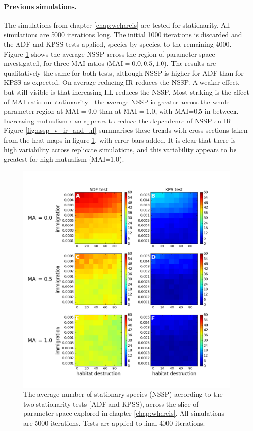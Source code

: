 \paragraph*{Previous simulations.} The simulations from chapter \ref{chap:wehereis} are tested for stationarity. All simulations are 5000 iterations long. The initial 1000 iterations is discarded and the ADF and KPSS tests applied, species by species, to the remaining 4000. Figure \ref{fig:nssp_ir_v_hl} shows the average NSSP across the region of parameter space investigated, for three MAI ratios (MAI$=0.0,0.5,1.0$). The results are qualitatively the same for both tests, although NSSP is higher for ADF than for KPSS as expected. On average reducing IR reduces the NSSP. A weaker effect, but still visible is that increasing HL reduces the NSSP. Most striking is the effect of MAI ratio on stationarity - the average NSSP is greater across the whole parameter region at MAI$=0.0$ than at MAI$=1.0$, with MAI=$0.5$ in between. Increasing mutualism also appears to reduce the dependence of NSSP on IR.  Figure \ref{fig:nssp_v_ir_and_hl} summarises these trends with cross sections taken from the heat maps in figure \ref{fig:nssp_ir_v_hl}, with error bars added. It is clear that there is high variability across replicate simulations, and this variability appears to be greatest for high mutualism (MAI=$1.0$).

\begin{figure}[hp]
	\centering
	\includegraphics[width=1.0\linewidth]{"./chapters/chapter04b/figures/nssp_ir_v_hl"}
    \caption{The average number of stationary species (NSSP) according to the two stationarity tests (ADF and KPSS), across the slice of parameter space explored in chapter \ref{chap:whereis}. All simulations are 5000 iterations. Tests are applied to final 4000 iterations.}    
    \label{fig:nssp_ir_v_hl}
\end{figure}



